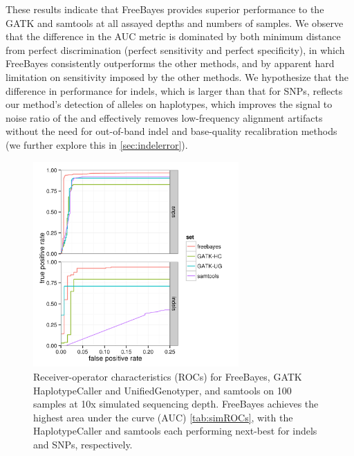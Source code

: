 \documentclass{article}
\begin{document}
These results indicate that FreeBayes provides superior performance to the GATK and samtools at all assayed depths and numbers of samples.
We observe that the difference in the AUC metric is dominated by both minimum distance from perfect discrimination (perfect sensitivity and perfect specificity), in which FreeBayes consistently outperforms the other methods, and by apparent hard limitation on sensitivity imposed by the other methods.  We hypothesize that the difference in performance for indels, which is larger than that for SNPs, reflects our method's detection of alleles on haplotypes, which improves the signal to noise ratio of the and effectively removes low-frequency alignment artifacts without the need for out-of-band indel and base-quality recalibration methods (we further explore this in \ref{sec:indelerror}).



\begin{figure}[h!]
\centering
\includegraphics[width=0.7\textwidth]{100samples10x_0_25_both}
\caption{Receiver-operator characteristics (ROCs) for FreeBayes, GATK HaplotypeCaller and UnifiedGenotyper, and samtools on 100 samples at 10x simulated sequencing depth.  FreeBayes achieves the highest area under the curve (AUC) \ref{tab:simROCs}, with the HaplotypeCaller and samtools each performing next-best for indels and SNPs, respectively.}
\label{fig:10xROC}
\end{figure}
\end{document}
